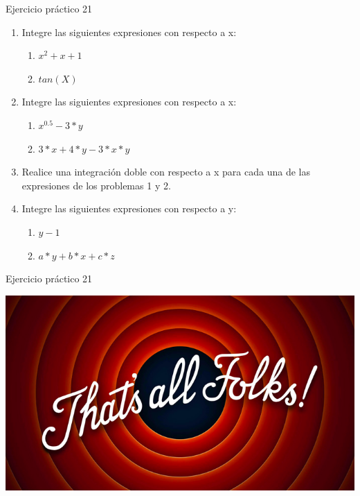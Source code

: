\documentclass{bredelebeamer}
\begin{document}
\begin{frame}{Ejercicio práctico 21}
\begin{enumerate}
\item Integre las siguientes expresiones con respecto a x:
\begin{enumerate}
\item $x^2+x+1$
\item $tan(X)$
\end{enumerate}
\item Integre las siguientes expresiones con respecto a x:
\begin{enumerate}
\item $x^{0.5 }-3*y$
\item $3*x+4*y-3*x*y$
\end{enumerate}
\item Realice una integración doble con respecto a x para cada una de las expresiones de los problemas 1 y 2.
\item Integre las siguientes expresiones con respecto a y:
\begin{enumerate}
\item $y-1$
\item $a*y+b*x+c*z$
\end{enumerate}
\end{enumerate}
\end{frame}

\begin{frame}{Ejercicio práctico 21}
\begin{center}
\includegraphics[scale=0.4]{images/img41.png}
\end{center}
\end{frame}
\end{document}

